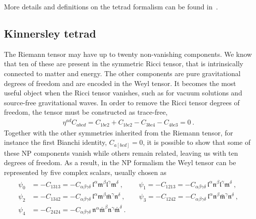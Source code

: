 More details and definitions on the tetrad formalism can be found in~.


\subsection{Kinnersley tetrad}

The Riemann tensor may have up to twenty non-vanishing components.
We know that ten of these are present in the symmetric Ricci tensor, that is intrinsically connected to matter and energy.
The other components are pure gravitational degrees of freedom and are encoded in the Weyl tensor.
It becomes the most useful object when the Ricci tensor vanishes, such as for vacuum solutions and source-free gravitational waves.
In order to remove the Ricci tensor degrees of freedom, the tensor must be constructed as trace-free,
\begin{align}
    \eta^{ad} C_{abcd} = C_{1bc2} + C_{1bc2} - C_{3bc4} - C_{4bc3} = 0 ~. 
\end{align}
Together with the other symmetries inherited from the Riemann tensor, for instance the first Bianchi identity, $C_{a[bcd]}=0$, it is possible to show that some of these NP components vanish while others remain related, leaving us with ten degrees of freedom.
As a result, in the NP formalism the Weyl tensor can be represented by five complex scalars, usually chosen as
\begin{align}
    \begin{split}
        \psi_0 &= - C_{1313} = - C_{\alpha\beta\gamma\delta}\, \mathfrak{l}^\alpha \mathfrak{m}^\beta \mathfrak{l}^\gamma \mathfrak{m}^\delta ~,\qquad
        ~\psi_1 = - C_{1213} = - C_{\alpha\beta\gamma\delta}\, \mathfrak{l}^\alpha \mathfrak{n}^\beta \mathfrak{l}^\gamma \mathfrak{m}^\delta ~,\\
        \psi_2 &= - C_{1342} = - C_{\alpha\beta\gamma\delta}\, \mathfrak{l}^\alpha \mathfrak{m}^\beta \bar{\mathfrak{m}}^\gamma \mathfrak{n}^\delta ~,\qquad
        \psi_3 = - C_{1242} = - C_{\alpha\beta\gamma\delta}\, \mathfrak{l}^\alpha \mathfrak{n}^\beta \bar{\mathfrak{m}}^\gamma \mathfrak{n}^\delta ~,\\
        \psi_4 &= - C_{2424} = - C_{\alpha\beta\gamma\delta}\, \mathfrak{n}^\alpha \bar{\mathfrak{m}}^\beta \mathfrak{n}^\gamma \bar{\mathfrak{m}}^\delta ~.
    \end{split}
\end{align}
